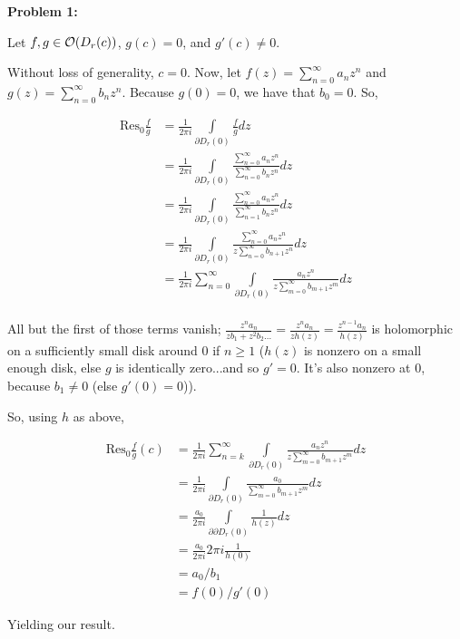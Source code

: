 \documentclass[a4paper,12pt]{article}
\begin{document}
{\bf Problem 1:}

Let $f, g \in \mathcal{O}(D_r(c))$, $g(c) = 0$, and $g'(c) \neq 0$. 

Without loss of generality, $c = 0$. Now, let $f(z) = \sum\limits_{n=0}^\infty a_nz^n$ and $g(z) = \sum\limits_{n=0}^\infty b_nz^n$. Because $g(0) = 0$, we have that $b_0 = 0$. So,

\begin{align*}
\text{Res}_0 \frac{f}{g} &= \frac{1}{2\pi i} \int\limits_{ \partial D_r(0)} \frac{f}{g} dz\\
&= \frac{1}{2\pi i} \int\limits_{ \partial D_r(0)} \frac{\sum\limits_{n=0}^\infty a_nz^n}{\sum\limits_{n=0}^\infty b_nz^n} dz\\
&= \frac{1}{2\pi i} \int\limits_{ \partial D_r(0)} \frac{\sum\limits_{n=0}^\infty a_nz^n}{\sum\limits_{n=1}^\infty b_nz^n} dz\\
&= \frac{1}{2\pi i} \int\limits_{ \partial D_r(0)} \frac{\sum\limits_{n=0}^\infty a_nz^n}{z\sum\limits_{n=0}^\infty b_{n+1}z^n} dz\\
&= \frac{1}{2\pi i} \sum\limits_{n=0}^\infty \int\limits_{ \partial D_r(0)} \frac{a_nz^n}{z\sum\limits_{m=0}^\infty b_{m+1}z^m} dz\\
\end{align*} 

All but the first of those terms vanish; $\frac{z^na_n}{zb_1 + z^2b_2 \ldots } = \frac{z^na_n}{zh(z)} = \frac{z^{n-1}a_n}{h(z)}$ is holomorphic on a sufficiently small disk around $0$ if $n \geq 1$ ($h(z)$ is nonzero on a small enough disk, else $g$ is identically zero...and so $g' = 0$. It's also nonzero at $0$, because $b_1 \neq 0$ (else $g'(0) = 0$)).

So, using $h$ as above,

\begin{align*}
\text{Res}_0 \frac{f}{g} (c) &= \frac{1}{2\pi i} \sum\limits_{n=k}^\infty \int\limits_{ \partial D_r(0)} \frac{a_nz^n}{z\sum\limits_{m=0}^\infty b_{m+1}z^m} dz\\
&= \frac{1}{2\pi i}  \int\limits_{ \partial D_r(0)} \frac{a_0}{\sum\limits_{m=0}^\infty b_{m+1}z^m} dz\\
&= \frac{a_0}{2\pi i}  \int\limits_{ \partial  \partial D_r(0)} \frac{1}{h(z)} dz\\
&= \frac{a_0}{2\pi i}  2\pi i \frac{1}{h(0)}\\
&= a_0/b_1\\
&= f(0)/g'(0)
\end{align*}

Yielding our result. 
\end{document}
